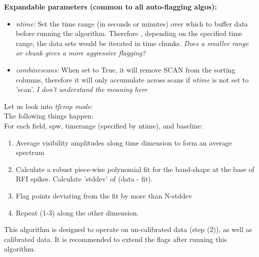 \documentclass[10pt]{report}
\newcommand{\tbf}[1]{\textbf{#1}}
\newcommand{\tit}[1]{\textit{#1}}
\begin{document}
\tbf{Expandable parameters (common to all auto-flagging algos):}\\
\begin{itemize}
\item \tit{ntime:} Set the time range (in seconds or minutes) over which to buffer data before running the algorithm. Therefore , depending on the specified time range, the data sets would be iterated in time chunks. \tit{Does a smaller range or chunk gives a more aggressive flagging?}
\item \tit{combinescans:} When set to True, it will remove SCAN from the sorting columns, therefore it will only accumulate across scans if \tit{ntime} is not set to 'scan'. \tit{I don't understand the meaning here}
\end{itemize}
Let us  look into \tit{tfcrop mode}:\\
The following things happen:\\
For each field, spw, timerange (specified by ntime), and baseline:
\begin{enumerate}
\item Average visibility amplitudes along time dimension to form an average spectrum
\item Calculate a robust piece-wise polynomial fit for the band-shape at the base of RFI spikes. Calculate 'stddev' of (data - fit).
\item Flag points deviating from the fit by more than N-stddev
\item Repeat (1-3) along the other dimension.
\end{enumerate}

This algorithm is designed to operate on un-calibrated data (step (2)), as well as calibrated data. It is recommended to extend the flags after running this algorithm.\\
\end{document}
